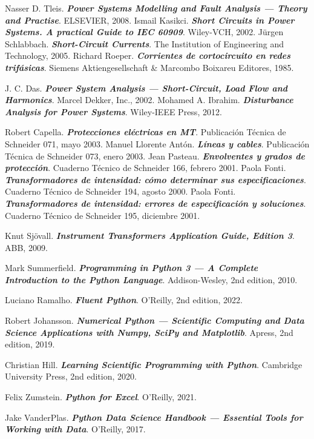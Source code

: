 \begin{thebibliography}{99}
     Nasser D. Tleis. \textbf{\textit{Power Systems Modelling and Fault Analysis --- Theory and Practise}}.  ELSEVIER, 2008.
     Ismail Kasikci. \textbf{\textit{Short Circuits in Power Systems. A practical Guide to IEC 60909}}.  Wiley-VCH, 2002.
     Jürgen Schlabbach. \textbf{\textit{Short-Circuit Currents}}.  The Institution of Engineering and Technology, 2005.
     Richard Roeper. \textbf{\textit{Corrientes de cortocircuito en redes trifásicas}}.  Siemens Aktiengesellschaft \& Marcombo Boixareu Editores, 1985.

     J. C. Das. \textbf{\textit{Power System Analysis --- Short-Circuit, Load Flow and Harmonics}}. Marcel Dekker, Inc., 2002.
     Mohamed A. Ibrahim. \textbf{\textit{Disturbance Analysis for Power Systems}}. Wiley-IEEE Press, 2012.

     Robert Capella. \textbf{\textit{Protecciones eléctricas en MT}}.  Publicación Técnica de Schneider 071, mayo 2003.
     Manuel Llorente Antón. \textbf{\textit{Líneas y cables}}.  Publicación Técnica de Schneider 073, enero 2003.
     Jean Pasteau. \textbf{\textit{Envolventes y grados de protección}}.  Cuaderno Técnico de Schneider 166, febrero 2001.
     Paola Fonti. \textbf{\textit{Transformadores de intensidad: cómo determinar sus especificaciones}}.  Cuaderno Técnico de Schneider 194, agosto 2000.
     Paola Fonti. \textbf{\textit{Transformadores de intensidad: errores de especificación y soluciones}}.  Cuaderno Técnico de Schneider 195, diciembre 2001.

     Knut Sjövall. \textbf{\textit{Instrument Transformers Application Guide, Edition 3}}.  ABB, 2009.
    
     Mark Summerfield. \textbf{\textit{Programming in Python 3 --- A Complete Introduction to the Python Language}}.  Addison-Wesley, 2nd edition, 2010.
    
     Luciano Ramalho. \textbf{\textit{Fluent Python}}.  O'Reilly, 2nd edition, 2022.
    	
     Robert Johansson. \textbf{\textit{Numerical
    		Python --- Scientific Computing and Data Science Applications with Numpy,
    		SciPy and Matplotlib}}.  Apress, 2nd edition, 2019.
    
     Christian Hill. \textbf{\textit{Learning Scientific Programming with Python}}.  Cambridge University Press, 2nd edition,  2020.
    
      Felix Zumstein. \textbf{\textit{Python for Excel}}.  O'Reilly, 2021.
        
      Jake VanderPlas. \textbf{\textit{Python Data Science Handbook --- Essential Tools for Working with Data}}.  O'Reilly, 2017.

\end{thebibliography}

